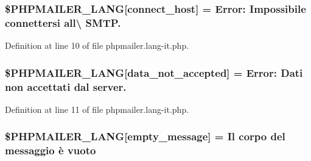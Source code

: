 \subsubsection[{\texorpdfstring{\$\+P\+H\+P\+M\+A\+I\+L\+E\+R\+\_\+\+L\+A\+NG}{$PHPMAILER_LANG}}]{\setlength{\rightskip}{0pt plus 5cm}\$P\+H\+P\+M\+A\+I\+L\+E\+R\+\_\+\+L\+A\+NG\mbox{[}\textquotesingle{}connect\+\_\+host\textquotesingle{}\mbox{]} =  Error\+: Impossibile connettersi all\textbackslash{} S\+M\+T\+P.\textquotesingle{}}\hypertarget{phpmailer_8lang-it_8php_a2ee0cc637a06b96e45600db31c6799ee}{}\label{phpmailer_8lang-it_8php_a2ee0cc637a06b96e45600db31c6799ee}


Definition at line 10 of file phpmailer.\+lang-\/it.\+php.

\subsubsection[{\texorpdfstring{\$\+P\+H\+P\+M\+A\+I\+L\+E\+R\+\_\+\+L\+A\+NG}{$PHPMAILER_LANG}}]{\setlength{\rightskip}{0pt plus 5cm}\$P\+H\+P\+M\+A\+I\+L\+E\+R\+\_\+\+L\+A\+NG\mbox{[}\textquotesingle{}data\+\_\+not\+\_\+accepted\textquotesingle{}\mbox{]} =  Error\+: Dati non accettati dal server.\textquotesingle{}}\hypertarget{phpmailer_8lang-it_8php_a814c6b191205d2361b3233e9c9d6fda5}{}\label{phpmailer_8lang-it_8php_a814c6b191205d2361b3233e9c9d6fda5}


Definition at line 11 of file phpmailer.\+lang-\/it.\+php.

\subsubsection[{\texorpdfstring{\$\+P\+H\+P\+M\+A\+I\+L\+E\+R\+\_\+\+L\+A\+NG}{$PHPMAILER_LANG}}]{\setlength{\rightskip}{0pt plus 5cm}\$P\+H\+P\+M\+A\+I\+L\+E\+R\+\_\+\+L\+A\+NG\mbox{[}\textquotesingle{}empty\+\_\+message\textquotesingle{}\mbox{]} = \textquotesingle{}Il corpo del messaggio è vuoto\textquotesingle{}}\hypertarget{phpmailer_8lang-it_8php_a33772099f637c9d6c2cd7425e0e37fed}{}\label{phpmailer_8lang-it_8php_a33772099f637c9d6c2cd7425e0e37fed}


